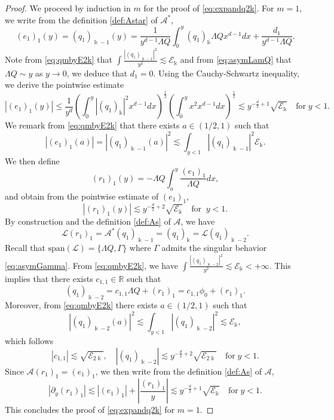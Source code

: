 \documentclass[11pt]{aims}
\theoremstyle{definition}
\numberwithin{equation}{section}
\begin{document}
\begin{proof}
We proceed by induction in $m$ for the proof of \eqref{eq:expandq2k}. For $m = 1$, we write from the definition \eqref{def:Astar} of ${\mathscr{A}}^*$,
$$(e_1)_1(y) =  (q_1)_{\Bbbk - 1}(y) = \frac{1}{y^{d-1}\Lambda Q}\int_0^y (q_1)_{\Bbbk} \Lambda Q x^{d-1}dx + \frac{d_1}{y^{d-1}\Lambda Q}.$$
Note from \eqref{eq:qmbyE2k} that $\int \frac{|(q_1)_{\Bbbk - 1}|^2}{y^2} \lesssim {\mathscr{E}}_{\Bbbk}$ and from \eqref{eq:asymLamQ} that $\Lambda Q \sim y$ as $y \to 0$, we deduce that $d_1 = 0$. Using the Cauchy-Schwartz inequality, we derive the pointwise estimate
$$|(e_1)_1(y)| \leq \frac{1}{y^d} \left(\int_0^y |(q_1)_{\Bbbk}|^2 x^{d-1}dx\right)^\frac{1}{2}\left(\int_0^y x^2x^{d-1} dx\right)^\frac{1}{2} \lesssim y^{-\frac{d}{2} + 1}\sqrt{{\mathscr{E}}_{\Bbbk}} \quad \text{for}\; y < 1.$$ 
We remark from \eqref{eq:qmbyE2k} that there exists $a \in (1/2,1)$ such that 
$$|(e_1)_1(a)| = |(q_1)_{\Bbbk - 1}(a)|^2 \lesssim \int_{y < 1} |(q_1)_{\Bbbk - 1}|^2 {\mathscr{E}}_{\Bbbk}.$$
We then define 
$$(r_1)_1(y) = -\Lambda Q \int_a^y \frac{(e_1)_1}{\Lambda Q}dx,$$
and obtain from the pointwise estimate of $(e_1)_1$, 
$$|(r_1)_1(y)| \lesssim  y^{-\frac{d}{2} + 2}\sqrt{{\mathscr{E}}_{\Bbbk}} \quad \text{for}\;\; y < 1.$$
By construction and the definition \eqref{def:As} of ${\mathscr{A}}$, we have 
$${\mathscr{L}} (r_1)_1 = {\mathscr{A}}^*(q_1)_{\Bbbk-1} = (q_1)_{\Bbbk} = {\mathscr{L}} (q_1)_{\Bbbk - 2}.$$
Recall that $\text{span}({\mathscr{L}}) = \{\Lambda Q, \Gamma\}$ where $\Gamma$ admits the singular behavior \eqref{eq:asymGamma}. From \eqref{eq:qmbyE2k}, we have $\int\frac{|(q_1)_{\Bbbk - 2}|^2}{y^2} \lesssim {\mathscr{E}}_{\Bbbk} < +\infty$. This implies that there exists $c_{1,1} \in {\mathbb{R}}$ such that 
$$(q_1)_{\Bbbk - 2} = c_{1,1} \Lambda Q + (r_1)_1 = c_{1,1}\phi_0 + (r_1)_1.$$
Moreover, from \eqref{eq:qmbyE2k} there exists $a \in (1/2,1)$ such that
$$|(q_1)_{\Bbbk - 2}(a)|^2 \lesssim \int_{y < 1} |(q_1)_{\Bbbk - 2}|^2\lesssim {\mathscr{E}}_{\Bbbk},$$
which follows
$$|c_{1,1}| \lesssim \sqrt{{\mathscr{E}}_{2\Bbbk}}, \quad |(q_1)_{\Bbbk - 2}| \lesssim y^{-\frac{d}{2} + 2}\sqrt{{\mathscr{E}}_{2\Bbbk}} \quad \text{for}\; y < 1.$$
Since ${\mathscr{A}} (r_1)_1 = (e_1)_1$, we then write from the definition \eqref{def:As} of ${\mathscr{A}}$, 
$$|{\partial_y} (r_1)_1| \lesssim |(e_1)_1| + \left|\frac{(r_1)_1}{y}\right| \lesssim y^{-\frac{d}{2} + 1}\sqrt{{\mathscr{E}}_{\Bbbk}} \quad \text{for}\; y < 1.$$
This concludes the proof of \eqref{eq:expandq2k} for $m = 1$.   


\end{proof}
\end{document}
